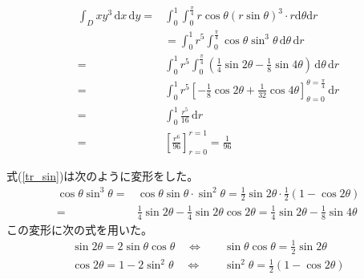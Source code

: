 \documentclass[12pt,b5paper]{ltjsarticle}
\begin{document}
\begin{enumerate}
\begin{enumerate}
             \begin{align}
              \int_{D}xy^3 \,\mathrm{d}x\,\mathrm{d}y
              =& \int_{0}^{1} \!\!\!\int_{0}^{\frac{\pi}{4}}
              r\cos\theta(r\sin\theta)^3\cdot r\mathrm{d}\theta\mathrm{d}r\\
              &= \int_{0}^{1} r^5\!\!\! \int_{0}^{\frac{\pi}{4}}
                \cos\theta \sin^3\theta\,\mathrm{d}\theta\,\mathrm{d}r \label{tr_sin}\\
              =& \int_{0}^{1} r^5\!\!\! \int_{0}^{\frac{\pi}{4}}
              \left(\frac{1}{4}\sin 2\theta - \frac{1}{8}\sin 4\theta\right)
                \,\mathrm{d}\theta\,\mathrm{d}r\\
              =& \int_{0}^{1} r^5
                \left[ -\frac{1}{8}\cos 2\theta + \frac{1}{32}\cos 4\theta \right]_{\theta=0}^{\theta=\frac{\pi}{4}}
                \,\mathrm{d}r\\
              =& \int_{0}^{1} \frac{r^5}{16}\,\mathrm{d}r\\
              =& \left[ \frac{r^6}{96} \right]_{r=0}^{r=1} = \frac{1}{96}
             \end{align}


             式(\ref{tr_sin})は次のように変形をした。
             \begin{align}
              \cos\theta \sin^3\theta
               =& \cos\theta \sin\theta \cdot \sin^2\theta
               = \frac{1}{2}\sin 2\theta \cdot \frac{1}{2}(1-\cos 2\theta)\\
               =& \frac{1}{4}\sin 2\theta - \frac{1}{4}\sin 2\theta\cos 2\theta
               = \frac{1}{4}\sin 2\theta - \frac{1}{8}\sin 4\theta
             \end{align}
             この変形に次の式を用いた。
             \begin{align}
              \sin 2\theta = 2\sin\theta\cos\theta
              \quad \Leftrightarrow & \quad
              \sin\theta\cos\theta = \frac{1}{2}\sin 2\theta\\
              \cos 2\theta = 1-2\sin^2\theta
              \quad \Leftrightarrow & \quad
              \sin^2\theta = \frac{1}{2}(1-\cos 2\theta)
             \end{align}



\end{enumerate}
\end{enumerate}
\end{document}
